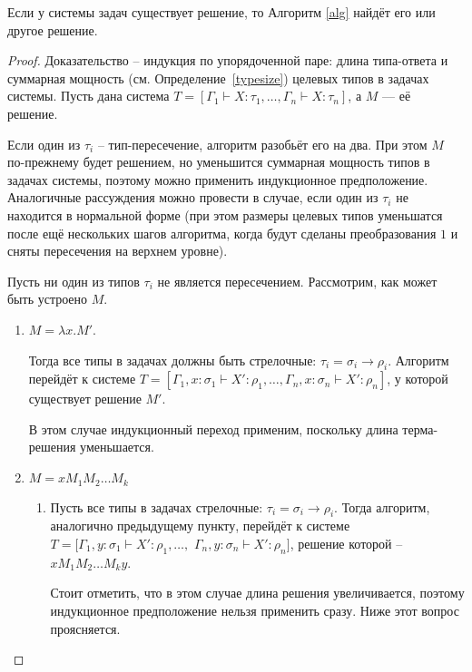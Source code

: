 \documentclass[../main.tex]{subfiles}
\begin{document}
\begin{theorem}[Completeness] \label{completeness}
Если у системы задач существует решение, то Алгоритм \ref{alg} найдёт его или другое решение. 
\end{theorem}
\begin{proof}
Доказательство -- индукция по упорядоченной паре: длина типа-ответа и суммарная мощность (см. Определение~\ref{typesize}) целевых типов в задачах системы.
Пусть дана система $T = [\Gamma_1 \vdash X \colon \tau_1 ,\dots, \Gamma_n \vdash X \colon \tau_n]$, а $M$ --- её решение.

Если один из $\tau_i$ -- тип-пересечение, алгоритм разобьёт его на два. При этом $M$ по-прежнему будет решением, но уменьшится суммарная мощность типов в задачах системы, поэтому можно применить индукционное предположение. Аналогичные рассуждения можно провести в случае, если один из $\tau_i$ не находится в нормальной форме (при этом размеры целевых типов уменьшатся после ещё нескольких шагов алгоритма, когда будут сделаны преобразования $1$ и сняты пересечения на верхнем уровне).

Пусть ни один из типов $\tau_i$ не является пересечением. 
Рассмотрим, как может быть устроено $M$.
\begin{enumerate}
    \item $M = \lambda x . M'$. 
    
    Тогда все типы в задачах должны быть стрелочные: $\tau_i = \sigma_i \to \rho_i$. Алгоритм перейдёт к системе $T = [\Gamma_1, x \colon \sigma_1 \vdash X' \colon \rho_1 ,\dots, \Gamma_n, x \colon \sigma_n \vdash X' \colon \rho_n]$, у которой существует решение $M'$.
    
    В этом случае индукционный переход применим, поскольку длина терма-решения уменьшается.
    
    \item $M = x M_1 M_2 \dots M_k$
        \begin{enumerate}
            \item \label{case:a} Пусть все типы в задачах стрелочные: $\tau_i = \sigma_i \to \rho_i$. 
                Тогда алгоритм, аналогично предыдущему пункту, перейдёт к системе $T = [\Gamma_1, y \colon \sigma_1 \vdash X' \colon \rho_1 ,\dots, $ $ \Gamma_n, y \colon \sigma_n \vdash X' \colon \rho_n]$, решение которой -- $x M_1 M_2 \dots M_k y$.
            
            Стоит отметить, что в этом случае длина решения увеличивается, поэтому индукционное предположение нельзя применить сразу. Ниже этот вопрос проясняется.
            

\end{enumerate}
\end{enumerate}
\end{proof}
\end{document}
